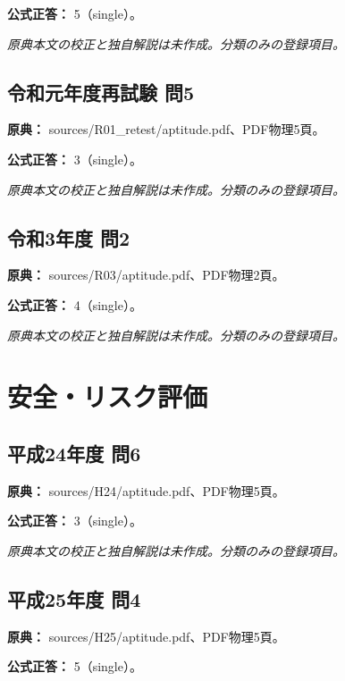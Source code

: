 \textbf{公式正答：} 5（single）。

\par\textit{原典本文の校正と独自解説は未作成。分類のみの登録項目。}

\subsection{令和元年度再試験 問5}
\label{q:r01-ret-apt-05}

\noindent\textbf{原典：} sources/R01\_retest/aptitude.pdf、PDF物理5頁。

\textbf{公式正答：} 3（single）。

\par\textit{原典本文の校正と独自解説は未作成。分類のみの登録項目。}

\subsection{令和3年度 問2}
\label{q:r03-reg-apt-02}

\noindent\textbf{原典：} sources/R03/aptitude.pdf、PDF物理2頁。

\textbf{公式正答：} 4（single）。

\par\textit{原典本文の校正と独自解説は未作成。分類のみの登録項目。}

\section{安全・リスク評価}

\subsection{平成24年度 問6}
\label{q:h24-reg-apt-06}

\noindent\textbf{原典：} sources/H24/aptitude.pdf、PDF物理5頁。

\textbf{公式正答：} 3（single）。

\par\textit{原典本文の校正と独自解説は未作成。分類のみの登録項目。}

\subsection{平成25年度 問4}
\label{q:h25-reg-apt-04}

\noindent\textbf{原典：} sources/H25/aptitude.pdf、PDF物理5頁。

\textbf{公式正答：} 5（single）。

